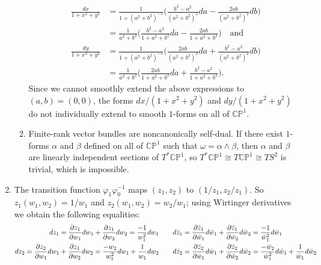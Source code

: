 \documentclass[11pt,leqno]{article}
\theoremstyle{plain}
\theoremstyle{definition}
\numberwithin{equation}{section}
\numberwithin{lem}{section}
\begin{document}
\begin{enumerate}
\begin{enumerate}
        \begin{align*}
            \frac{dx}{1 + x^2 + y^2} &= \frac{1}{1 + (a^2 + b^2)^{-1}}\bigg(\frac{b^2 - a^2}{(a^2 + b^2)^2}da - \frac{2ab}{(a^2 + b^2)^2}db\bigg)\\
            &= \frac{1}{a^2 + b^2}\bigg(\frac{b^2 - a^2}{1 + a^2 + b^2}da - \frac{2ab}{1 + a^2 + b^2}\bigg)\quad\text{and}\\
            \frac{dy}{1 + x^2 + y^2} &= \frac{1}{1 + (a^2 + b^2)^{-1}}\bigg(\frac{2ab}{(a^2 + b^2)^2}da + \frac{b^2-a^2}{(a^2 + b^2)^2}db\bigg)\\
            &= \frac{1}{a^2 + b^2}\bigg(\frac{2ab}{1 + a^2 + b^2}da + \frac{b^2 - a^2}{1 + a^2 + b^2}\bigg).
        \end{align*}
        Since we cannot smoothly extend the above expressions to $(a,b) = (0,0)$, the forms $dx/(1 + x^2 + y^2)$ and $dy/(1 + x^2 + y^2)$ do not individually extend to smooth $1$-forms on all of $\mathbb{CP}^1$.
        \item Finite-rank vector bundles are noncanonically self-dual. If there exist $1$-forms $\alpha$ and $\beta$ defined on all of $\mathbb{CP}^1$ such that $\omega = \alpha\wedge \beta$, then $\alpha$ and $\beta$ are linearly independent sections of $T^\ast\mathbb{CP}^1$, so $T^\ast\mathbb{CP}^1\cong T \mathbb{CP}^1\cong TS^2$ is trivial, which is impossible.
    \end{enumerate}
    \item The transition function $\varphi_1\varphi_0^{-1}$ maps $(z_1,z_2)$ to $(1/z_1,z_2/z_1)$. So $z_1(w_1,w_2) = 1/w_1$ and $z_2(w_1,w_2) = w_2/w_1$; using Wirtinger derivatives we obtain the following equalities: 
    \begin{align*}
        dz_1 = \pdv{z_1}{w_1}dw_1 + \pdv{z_1}{w_2}dw_2 = \frac{-1}{w_1^2}dw_1 \quad &\quad d\bar z_1 = \pdv{\bar z_1}{\bar w_1}d\bar w_1 + \pdv{\bar z_1}{\bar w_2}d\bar w_2 = \frac{-1}{\bar w_1^2}d\bar w_1\\
        dz_2 = \pdv{z_2}{w_1}dw_1 + \pdv{z_1}{w_2}dw_2 = \frac{-w_2}{w_1^2}dw_1 + \frac{1}{w_1}dw_2 \quad &\quad d\bar z_2 = \pdv{\bar z_2}{\bar w_1}d\bar w_1 + \pdv{\bar z_2}{\bar w_2}d\bar w_2 = \frac{-\bar w_2}{\bar w_1^2}d\bar w_1 + \frac{1}{\bar w_1}d\bar w_2
    \end{align*}


\end{enumerate}
\end{document}
